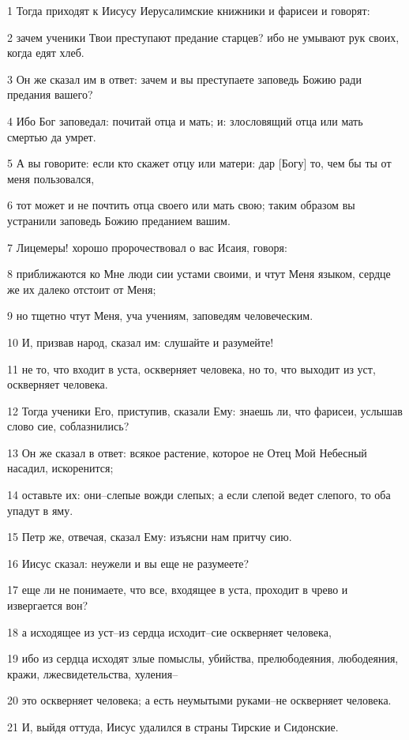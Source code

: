 \par 1 Тогда приходят к Иисусу Иерусалимские книжники и фарисеи и говорят:
\par 2 зачем ученики Твои преступают предание старцев? ибо не умывают рук своих, когда едят хлеб.
\par 3 Он же сказал им в ответ: зачем и вы преступаете заповедь Божию ради предания вашего?
\par 4 Ибо Бог заповедал: почитай отца и мать; и: злословящий отца или мать смертью да умрет.
\par 5 А вы говорите: если кто скажет отцу или матери: дар [Богу] то, чем бы ты от меня пользовался,
\par 6 тот может и не почтить отца своего или мать свою; таким образом вы устранили заповедь Божию преданием вашим.
\par 7 Лицемеры! хорошо пророчествовал о вас Исаия, говоря:
\par 8 приближаются ко Мне люди сии устами своими, и чтут Меня языком, сердце же их далеко отстоит от Меня;
\par 9 но тщетно чтут Меня, уча учениям, заповедям человеческим.
\par 10 И, призвав народ, сказал им: слушайте и разумейте!
\par 11 не то, что входит в уста, оскверняет человека, но то, что выходит из уст, оскверняет человека.
\par 12 Тогда ученики Его, приступив, сказали Ему: знаешь ли, что фарисеи, услышав слово сие, соблазнились?
\par 13 Он же сказал в ответ: всякое растение, которое не Отец Мой Небесный насадил, искоренится;
\par 14 оставьте их: они--слепые вожди слепых; а если слепой ведет слепого, то оба упадут в яму.
\par 15 Петр же, отвечая, сказал Ему: изъясни нам притчу сию.
\par 16 Иисус сказал: неужели и вы еще не разумеете?
\par 17 еще ли не понимаете, что все, входящее в уста, проходит в чрево и извергается вон?
\par 18 а исходящее из уст--из сердца исходит--сие оскверняет человека,
\par 19 ибо из сердца исходят злые помыслы, убийства, прелюбодеяния, любодеяния, кражи, лжесвидетельства, хуления--
\par 20 это оскверняет человека; а есть неумытыми руками--не оскверняет человека.
\par 21 И, выйдя оттуда, Иисус удалился в страны Тирские и Сидонские.

